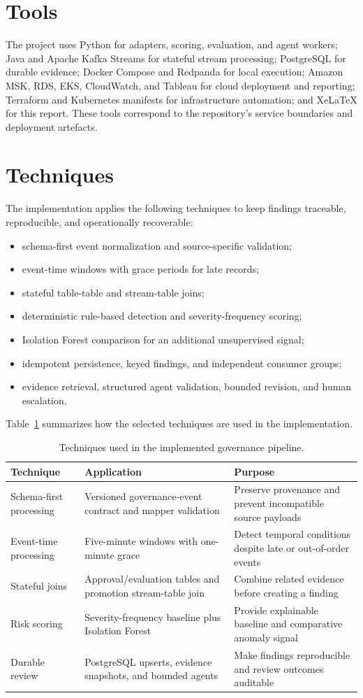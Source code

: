 \documentclass[12pt,oneside]{report}
\begin{document}
\section{Tools}
The project uses Python for adapters, scoring, evaluation, and agent workers; Java and Apache Kafka Streams for stateful stream processing; PostgreSQL for durable evidence; Docker Compose and Redpanda for local execution; Amazon MSK, RDS, EKS, CloudWatch, and Tableau for cloud deployment and reporting; Terraform and Kubernetes manifests for infrastructure automation; and XeLaTeX for this report. These tools correspond to the repository's service boundaries and deployment artefacts.
\section{Techniques}
The implementation applies the following techniques to keep findings traceable, reproducible, and operationally recoverable:
\begin{itemize}[leftmargin=*]
\item schema-first event normalization and source-specific validation;
\item event-time windows with grace periods for late records;
\item stateful table-table and stream-table joins;
\item deterministic rule-based detection and severity-frequency scoring;
\item Isolation Forest comparison for an additional unsupervised signal;
\item idempotent persistence, keyed findings, and independent consumer groups;
\item evidence retrieval, structured agent validation, bounded revision, and human escalation.
\end{itemize}
Table~\ref{tab:techniques} summarizes how the selected techniques are used in the implementation.
\begin{table}[H]\centering\small\begin{tabular}{|p{3.0cm}|p{4.1cm}|p{4.0cm}|}\hline
\textbf{Technique} & \textbf{Application} & \textbf{Purpose}\\\hline
Schema-first processing & Versioned governance-event contract and mapper validation & Preserve provenance and prevent incompatible source payloads\\\hline
Event-time processing & Five-minute windows with one-minute grace & Detect temporal conditions despite late or out-of-order events\\\hline
Stateful joins & Approval/evaluation tables and promotion stream-table join & Combine related evidence before creating a finding\\\hline
Risk scoring & Severity-frequency baseline plus Isolation Forest & Provide explainable baseline and comparative anomaly signal\\\hline
Durable review & PostgreSQL upserts, evidence snapshots, and bounded agents & Make findings reproducible and review outcomes auditable\\\hline
\end{tabular}\caption{Techniques used in the implemented governance pipeline.}\label{tab:techniques}\end{table}
\end{document}
